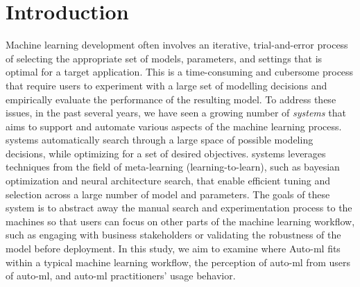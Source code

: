 \section{Introduction}
Machine learning development often involves an iterative, trial-and-error process of selecting the appropriate set of models, parameters, and settings that is optimal for a target application. This is a time-consuming and cubersome process that require users to experiment with a large set of modelling decisions and empirically evaluate the performance of the resulting model. To address these issues, in the past several years, we have seen a growing number of \emph{\automl systems} that aims to support and automate various aspects of the machine learning process. \automl systems automatically search through a large space of possible modeling decisions, while optimizing for a set of desired objectives. \automl systems leverages techniques from the field of meta-learning (learning-to-learn), such as bayesian optimization and neural architecture search, that enable efficient tuning and selection across a large number of model and parameters. The goals of these system is to abstract away the manual search and experimentation process to the machines so that users can focus on other parts of the machine learning workflow, such as engaging with business stakeholders or validating the robustness of the model before deployment.
In this study, we aim to examine where Auto-ml fits within a typical machine learning workflow, the perception of auto-ml from users of auto-ml, and auto-ml practitioners’ usage behavior. 



